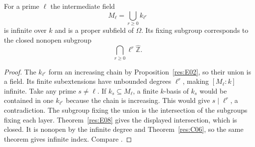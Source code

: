 \begin{example}\label{res:E09}
For a prime \(\ell\) the intermediate field
\[
              M_\ell=\bigcup_{r\geq0}k_{\ell^r}
\]
is infinite over \(k\) and is a proper subfield of \(\Omega\).
Its fixing subgroup corresponds to the closed nonopen subgroup
\[
                       \bigcap_{r\geq0}\ell^r\widehat{\mathbb Z}.
\]
\end{example}
\begin{proof}
The \(k_{\ell^r}\) form an increasing chain by Proposition~\ref{res:E02},
so their union is a field. Its finite subextensions have unbounded
degrees \(\ell^r\), making \([M_\ell:k]\) infinite. Take any prime
\(s\ne\ell\). If \(k_s\subseteq M_\ell\), a finite \(k\)-basis of
\(k_s\) would be contained in one \(k_{\ell^r}\) because the chain
is increasing. This would give \(s\mid\ell^r\), a contradiction.
The subgroup fixing the union is the intersection of the subgroups
fixing each layer. Theorem~\ref{res:E08} gives the displayed
intersection, which is closed. It is nonopen by the infinite degree
and Theorem~\ref{res:C06}, so the same theorem gives infinite index.
Compare
\cite[Remark 7.14 and Example 7.17]{milne}.
\end{proof}
